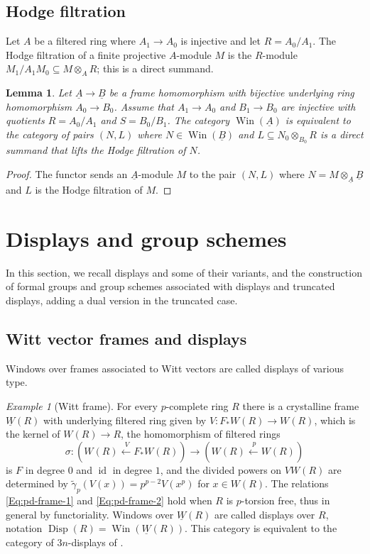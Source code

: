 \documentclass[a4paper,11pt]{amsart}
\theoremstyle{plain}
\newtheorem{Lemma}[equation]{Lemma}
\theoremstyle{definition}
\theoremstyle{remark}
\newtheorem{Example}[equation]{Example}
\newcommand{\bLe}{\begin{Lemma}}
\newcommand{\eLe}{\end{Lemma}}
\newcommand{\bEx}{\begin{Example}}
\newcommand{\eEx}{\end{Example}}
\newcommand{\bproof}{\begin{proof}}
\newcommand{\eproof}{\end{proof}}
\renewcommand{\u}{\underline}
\newcommand{\uM}{M} %
\newcommand{\uN}{N} %
\numberwithin{equation}{section}
\DeclareMathOperator{\id}{id}
\DeclareMathOperator{\Disp}{Disp}
\DeclareMathOperator{\Win}{Win}
\newcommand{\cclearpage}{}%
\begin{document}
\subsection{Hodge filtration}  
\label{Se:Hodge-fil}

Let $A$ be a filtered ring where $A_1\to A_0$ is injective and let $R=A_0/A_1$. The Hodge filtration of a finite projective $A$-module $M$ is the $R$-module $M_1/A_1M_0\subseteq M\otimes_AR$; this is a direct summand.

\bLe
Let $\u A\to\u B$ be a frame homomorphism with bijective underlying ring homomorphism $A_0\to B_0$. Assume that $A_1\to A_0$ and $B_1\to B_0$ are injective with quotients $R=A_0/A_1$ and $S=B_0/B_1$. 
The category $\Win(\u A)$ is equivalent to the category of pairs $(\uN,L)$ where $\uN\in\Win(\u B)$ and $L\subseteq N_0\otimes_{B_0}R$ is a direct summand that lifts the Hodge filtration of $N$.
\eLe

\bproof
The functor sends an $\u A$-module $\uM$ to the pair $(\uN,L)$ where $\uN=\uM\otimes_{\u A}\u B$ and $L$ is the Hodge filtration of $M$.
\eproof

\cclearpage
\section{Displays and group schemes}

In this section, we recall displays and some of their variants, and the construction of formal groups and group schemes associated with displays and truncated displays, adding a dual version in the truncated case.

\subsection{Witt vector frames and displays}

Windows over frames associated to Witt vectors are called displays of various type.

\bEx
[Witt frame]
\label{Ex:Witt-frame}
For every $p$-complete ring $R$ there is a crystalline frame $\u W(R)$ with underlying filtered ring given by $V\colon F_*W(R)\to W(R)$, which is the kernel of $W(R)\to R$, the homomorphism of filtered rings
\[
\sigma\colon (W(R)\xleftarrow{\:V}F_*W(R))\longrightarrow(W(R)\xleftarrow{\: p} W(R))
\] 
is $F$ in degree $0$ and $\id$ in degree $1$, and the divided powers on $VW(R)$ are determined by $\tilde\gamma_p(V(x))=p^{p-2}V(x^p)$ for $x\in W(R)$. The relations \eqref{Eq:pd-frame-1} and \eqref{Eq:pd-frame-2} hold when $R$ is $p$-torsion free, thus in general by functoriality. 
Windows over $\u W(R)$ are called displays over $R$, notation $\Disp(R)=\Win(\u W(R))$. This category is equivalent to the category of $3n$-displays of \cite{Zink:The-display}.
\eEx
\end{document}
